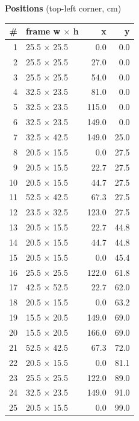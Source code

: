 \documentclass[a4paper,landscape,10pt]{article}
\begin{document}
\begin{minipage}[t]{0.25\textwidth}
\vspace{8pt}
{\bfseries Positions} (top-left corner, cm)\\[2pt]
\tiny
\begin{tabular}{@{}r l r r@{}}
\toprule
\# & frame w $\times$ h & x & y \\
\midrule
1 & 25.5 $\times$ 25.5 & 0.0 & 0.0 \\
2 & 25.5 $\times$ 25.5 & 27.0 & 0.0 \\
3 & 25.5 $\times$ 25.5 & 54.0 & 0.0 \\
4 & 32.5 $\times$ 23.5 & 81.0 & 0.0 \\
5 & 32.5 $\times$ 23.5 & 115.0 & 0.0 \\
6 & 32.5 $\times$ 23.5 & 149.0 & 0.0 \\
7 & 32.5 $\times$ 42.5 & 149.0 & 25.0 \\
8 & 20.5 $\times$ 15.5 & 0.0 & 27.5 \\
9 & 20.5 $\times$ 15.5 & 22.7 & 27.5 \\
10 & 20.5 $\times$ 15.5 & 44.7 & 27.5 \\
11 & 52.5 $\times$ 42.5 & 67.3 & 27.5 \\
12 & 23.5 $\times$ 32.5 & 123.0 & 27.5 \\
13 & 20.5 $\times$ 15.5 & 22.7 & 44.8 \\
14 & 20.5 $\times$ 15.5 & 44.7 & 44.8 \\
15 & 20.5 $\times$ 15.5 & 0.0 & 45.4 \\
16 & 25.5 $\times$ 25.5 & 122.0 & 61.8 \\
17 & 42.5 $\times$ 52.5 & 22.7 & 62.0 \\
18 & 20.5 $\times$ 15.5 & 0.0 & 63.2 \\
19 & 15.5 $\times$ 20.5 & 149.0 & 69.0 \\
20 & 15.5 $\times$ 20.5 & 166.0 & 69.0 \\
21 & 52.5 $\times$ 42.5 & 67.3 & 72.0 \\
22 & 20.5 $\times$ 15.5 & 0.0 & 81.1 \\
23 & 25.5 $\times$ 25.5 & 122.0 & 89.0 \\
24 & 32.5 $\times$ 23.5 & 149.0 & 91.0 \\
25 & 20.5 $\times$ 15.5 & 0.0 & 99.0 \\
\bottomrule
\end{tabular}
\end{minipage}
\clearpage
\end{document}
